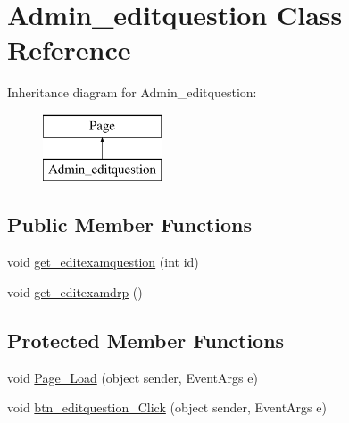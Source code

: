 \hypertarget{class_admin__editquestion}{}\section{Admin\+\_\+editquestion Class Reference}
\label{class_admin__editquestion}
Inheritance diagram for Admin\+\_\+editquestion\+:\begin{figure}[H]
\begin{center}
\leavevmode
\includegraphics[height=2.000000cm]{class_admin__editquestion}
\end{center}
\end{figure}
\subsection*{Public Member Functions}
\begin{DoxyCompactItemize}
\item 
void \mbox{\hyperlink{class_admin__editquestion_a6449c0f7d839e45eddbe36ad41e382a3}{get\+\_\+editexamquestion}} (int id)
\item 
void \mbox{\hyperlink{class_admin__editquestion_a2b69c6d5cb940ae6c3261e8dde761984}{get\+\_\+editexamdrp}} ()
\end{DoxyCompactItemize}
\subsection*{Protected Member Functions}
\begin{DoxyCompactItemize}
\item 
void \mbox{\hyperlink{class_admin__editquestion_ae962df1dc72b4a0e0a6b7cdd4eda99f1}{Page\+\_\+\+Load}} (object sender, Event\+Args e)
\item 
void \mbox{\hyperlink{class_admin__editquestion_af567b7ee725738bdaaadbf06ad179b30}{btn\+\_\+editquestion\+\_\+\+Click}} (object sender, Event\+Args e)
\end{DoxyCompactItemize}
